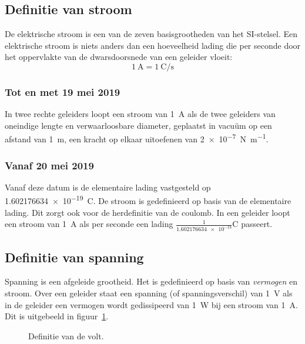 \subsection{Definitie van stroom}
De elektrische stroom is een van de zeven basisgrootheden van het SI-stelsel. Een elektrische stroom is niets anders dan een hoeveelheid lading die per seconde door het oppervlakte van de dwarsdoorsnede van een geleider vloeit:
%
\begin{equation}
\SI{1}{\ampere} = \SI[per-mode=fraction]{1}{\coulomb\per\second}
\end{equation} 

\subsubsection*{Tot en met 19 mei 2019}
In twee rechte geleiders loopt een stroom van \SI{1}{\ampere} als de twee geleiders van oneindige lengte en verwaarloosbare diameter, geplaatst in vacuüm op een afstand van \SI{1}{\meter}, een kracht op elkaar uitoefenen van \SI[per-mode=symbol]{2e-7}{\newton\per\meter}.

\subsubsection*{Vanaf 20 mei 2019}
Vanaf deze datum is de elementaire lading vastgesteld op \SI{1.602176634e-19}{\coulomb}. De stroom is gedefinieerd op basis van de elementaire lading. Dit zorgt ook voor de herdefinitie van de coulomb. In een geleider loopt een stroom van \SI{1}{\ampere} als per seconde een lading $\frac{1}{\num{1.602176634e-19}}\si{\coulomb}$ passeert.

\subsection{Definitie van spanning}
Spanning is een afgeleide grootheid. Het is gedefinieerd op basis van \textsl{vermogen} en stroom. Over een geleider staat een spanning (of spanningsverschil) van \SI{1}{\volt} als in de geleider een vermogen wordt gedissipeerd van \SI{1}{\watt} bij een stroom van \SI{1}{\ampere}. Dit is uitgebeeld in figuur~\ref{fig:intdefinitievolt}.

\begin{figure}[!ht]
\centering
{}
\caption{Definitie van de volt.}
\label{fig:intdefinitievolt}
\end{figure}


